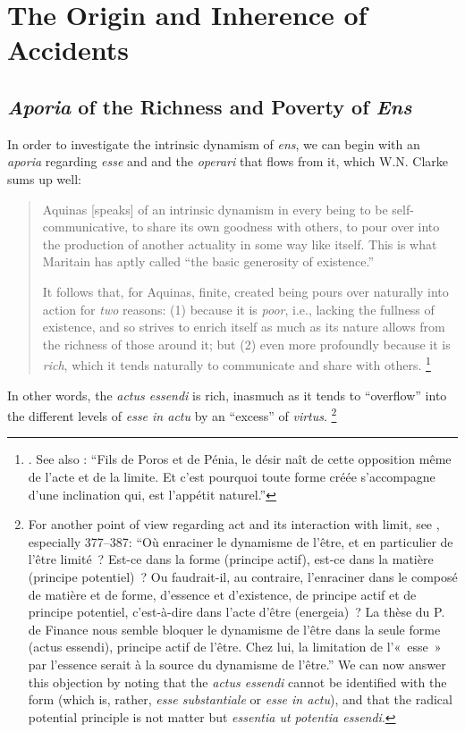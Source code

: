 \section{The Origin and Inherence of Accidents}

\subsection{\emph{Aporia} of the Richness and Poverty of \emph{Ens}}
\label{sec:aporia}

In order to investigate the intrinsic dynamism of \emph{ens}, we can begin with an \emph{aporia} regarding \emph{esse} and and the \emph{operari} that flows from it, which W.N. Clarke sums up well:
%
\begin{quotation}
Aquinas [speaks] of an intrinsic dynamism in every being to be self-communica\-tive, to share its own goodness with others, to pour over into the production of another actuality in some way like itself. This is what Maritain has aptly called ``the basic generosity of existence.''

It follows that, for Aquinas, finite, created being pours over naturally into action for \emph{two} reasons: (1) because it is \emph{poor}, i.e., lacking the fullness of existence, and so strives to enrich itself as much as its nature allows from the richness of those around it; but (2) even more profoundly because it is \emph{rich}, which it tends naturally to communicate and share with others.%
%
\footnote{\Cite[605]{clarke:person-being}. See also \cite[163--164]{definance:etre-et-agir}: ``Fils de Poros et de Pénia, le désir naît de cette opposition même de l'acte et de la limite. Et c'est pourquoi toute forme créée s'accompagne d'une inclination qui, est l'appétit naturel.''}
\end{quotation}
%
In other words, the \emph{actus essendi} is rich, inasmuch as it tends to ``overflow'' into the different levels of \emph{esse in actu} by an ``excess'' of \emph{virtus}.%
%
\footnote{For another point of view regarding act and its interaction with limit, see \cite{kambembo:essai}, especially 377--387: ``Où enraciner le dynamisme de l'être, et en particulier de l'être limité~? Est-ce dans la forme (principe actif), est-ce dans la matière (principe potentiel)~? Ou faudrait-il, au contraire, l'enraciner dans le composé de matière et de forme, d'essence et d'existence, de principe actif et de principe potentiel, c'est-à-dire dans l'acte d'être (energeia)~? La thèse du P. de Finance nous semble bloquer le dynamisme de l'être dans la seule forme (actus essendi), principe actif de l'être. Chez lui, la limitation de l'«~esse~» par l'essence serait à la source du dynamisme de l'être.'' We can now answer this objection by noting that the \emph{actus essendi} cannot be identified with the form (which is, rather, \emph{esse substantiale} or \emph{esse in actu}), and that the radical potential principle is not matter but \emph{essentia ut potentia essendi}.}
